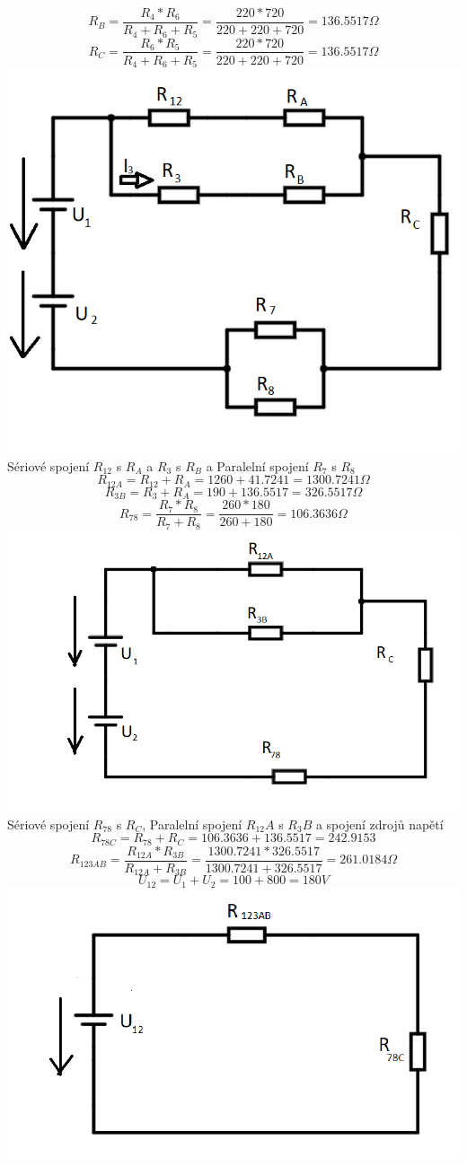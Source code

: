 \documentclass[11pt]{article}
\begin{document}
$$R_B = \frac{R_4 * R_6}{R_4 + R_6 + R_5} = \frac{220*720}{220+220+720} = 136.5517\Omega$$
$$R_C = \frac{R_6 * R_5}{R_4 + R_6 + R_5} = \frac{220*720}{220+220+720} = 136.5517\Omega$$
\includegraphics[width=0.8\linewidth]{priklad1_transfigurace.png}\\
\newpage
Sériové spojení $R_{12}$ s $R_A$ a $R_3$ s $R_B$ a Paralelní spojení $R_7$ s $R_8$
$$R_{12A} = R_{12} + R_A = 1260 + 41.7241 = 1300.7241\Omega$$
$$R_{3B} = R_3 + R_A = 190 + 136.5517 = 326.5517\Omega$$
$$R_{78} = \frac{R_7 * R_8}{R_7 + R_8} = \frac{260 * 180}{260 + 180} = 106.3636\Omega$$
\includegraphics[width=0.8\linewidth]{priklad1_zjednoduseni1.png}\\
Sériové spojení $R_{78}$ s $R_C$, Paralelní spojení $R_12A$ s $R_3B$ a spojení zdrojů napětí
$$R_{78C} = R_{78} + R_{C} = 106.3636 + 136.5517 = 242.9153$$
$$R_{123AB} = \frac{R_{12A} * R_{3B}}{R_{12A} + R_{3B}} = \frac{1300.7241 * 326.5517}{1300.7241 + 326.5517} = 261.0184\Omega$$
$$U_{12} = U_1 + U_2 = 100 + 800 = 180V$$
\includegraphics[width=0.8\linewidth]{priklad1_zjednoduseni2.png}\\
\end{document}
